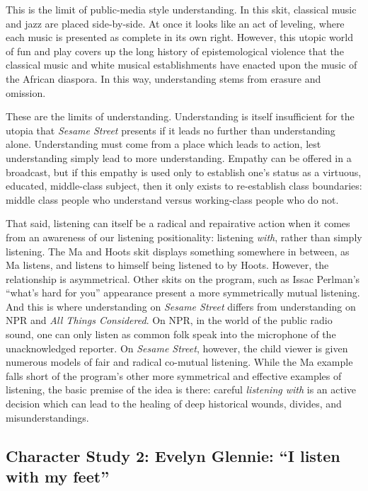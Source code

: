 \documentclass[12pt,letterpaper]{article}
\newcommand{\ses}{\textit{Sesame Street }}
\begin{document}
	This is the limit of public-media style understanding. In this skit, 
	classical music and jazz are placed side-by-side. At once it looks like
	an act of leveling, where each music is presented as complete in its own
	right. However, this utopic world of fun and play covers up the long 
	history of epistemological violence that the classical music and white 
	musical establishments have enacted upon the music of the African 
	diaspora. In this way, understanding stems from erasure and omission.

	These are the limits of understanding. Understanding is itself 
	insufficient for the utopia that \ses presents if it leads no further 
	than understanding alone. Understanding must come from a place which 
	leads to
	 action, lest understanding simply lead to more understanding. 
	Empathy can be offered in a 
	broadcast, but if this empathy is used only to establish one's status 
	as a virtuous, educated, middle-class subject, then it only exists to 
	re-establish class boundaries: middle class people who understand 
	versus working-class people who do not.  
	 
	That said, listening can itself be a radical and repairative action when
	it comes from an awareness of our listening positionality: listening 
	\textit{with}, rather than simply listening. The Ma and Hoots skit 
	displays something somewhere in between, as Ma listens, and listens to 
	himself being listened to by Hoots. However, the relationship is 
	asymmetrical. Other skits on the program, such as Issac Perlman's 
	``what's hard for you'' appearance present a more symmetrically mutual 
	listening. And this is where understanding on \ses differs from 
	understanding on NPR and \textit{All Things Considered}. On NPR, in the
	world of the public radio sound, one can only listen as common folk 
	speak into the microphone of the unacknowledged reporter. On 
	\textit{Sesame Street}, 
	however, the child viewer is given numerous models of fair and radical 
	co-mutual listening. While the Ma example falls short of the program's 
	other more symmetrical and effective examples of listening, the basic 
	premise
	of the idea is there: careful \textit{listening with} is an active
	decision which can lead to the healing of deep historical wounds, 
	divides, and misunderstandings.

	\subsection*{Character Study 2: Evelyn Glennie: ``I listen with my feet''} 



\newpage
\singlespacing
\printbibliography
\end{document}
